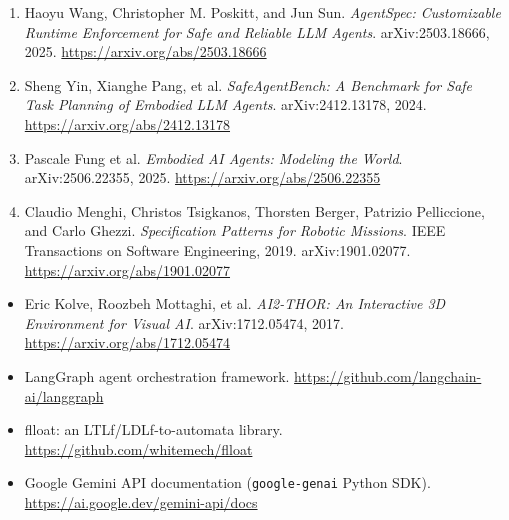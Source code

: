 \documentclass [11pt,twoside]{article}
\begin{document}
\clearpage
{}

\begin{enumerate}
    \item \label{ref:agentspec} Haoyu Wang, Christopher M. Poskitt, and Jun Sun. \emph{AgentSpec: Customizable Runtime Enforcement for Safe and Reliable LLM Agents}. arXiv:2503.18666, 2025. \url{https://arxiv.org/abs/2503.18666}

    \item \label{ref:safeagentbench} Sheng Yin, Xianghe Pang, et al. \emph{SafeAgentBench: A Benchmark for Safe Task Planning of Embodied LLM Agents}. arXiv:2412.13178, 2024. \url{https://arxiv.org/abs/2412.13178}

    \item \label{ref:embodied-world-models} Pascale Fung et al. \emph{Embodied AI Agents: Modeling the World}. arXiv:2506.22355, 2025. \url{https://arxiv.org/abs/2506.22355}

    \item \label{ref:spec-patterns} Claudio Menghi, Christos Tsigkanos, Thorsten Berger, Patrizio Pelliccione, and Carlo Ghezzi. \emph{Specification Patterns for Robotic Missions}. IEEE Transactions on Software Engineering, 2019. arXiv:1901.02077. \url{https://arxiv.org/abs/1901.02077}
\end{enumerate}

\begin{itemize}
    \item Eric Kolve, Roozbeh Mottaghi, et al. \emph{AI2-THOR: An Interactive 3D Environment for Visual AI}. arXiv:1712.05474, 2017. \url{https://arxiv.org/abs/1712.05474}

    \item LangGraph agent orchestration framework. \url{https://github.com/langchain-ai/langgraph}

    \item flloat: an LTLf/LDLf-to-automata library. \url{https://github.com/whitemech/flloat}

    \item Google Gemini API documentation (\texttt{google-genai} Python SDK). \url{https://ai.google.dev/gemini-api/docs}
\end{itemize}
\end{document}
